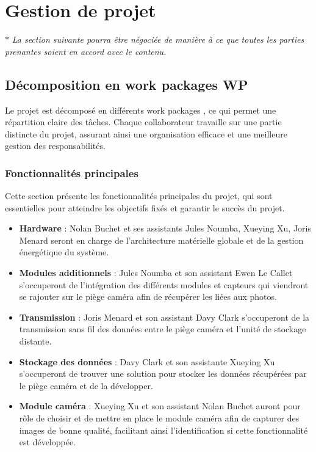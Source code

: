 \section{Gestion de projet}

$ \ast $ \textit{La section suivante pourra être négociée de manière à ce que toutes les parties prenantes soient en accord avec le contenu.}

\subsection{Décomposition en work packages WP}
Le projet est décomposé en différents work packages , ce qui permet une répartition claire des tâches.
Chaque collaborateur travaille sur une partie distincte du projet, assurant ainsi une organisation efficace et une meilleure gestion des responsabilités.

\subsubsection{Fonctionnalités principales}
Cette section présente les fonctionnalités principales du projet, qui sont essentielles pour atteindre les objectifs fixés et garantir le succès du projet. \\
\begin{itemize}
    \item \textbf{Hardware} : Nolan Buchet et ses assistants Jules Noumba, Xueying Xu, Joris Menard seront en charge de l’architecture matérielle globale et de la gestion énergétique du système.
    \item \textbf{Modules additionnels} : Jules Noumba et son assistant Ewen Le Callet s’occuperont de l’intégration des différents modules et capteurs qui viendront se rajouter sur le piège caméra afin de récupérer les  liées aux photos.
    \item \textbf{Transmission} : Joris Menard et son assistant Davy Clark s'occuperont de la transmission sans fil des données entre le piège caméra et l'unité de stockage distante.
    \item \textbf{Stockage des données} : Davy Clark et son assistante Xueying Xu s'occuperont de trouver une solution pour stocker les données récupérées par le piège caméra et de la développer.
    \item \textbf{Module caméra} : Xueying Xu et son assistant Nolan Buchet auront pour rôle de choisir et de mettre en place le module caméra afin de capturer des images de bonne qualité, facilitant ainsi l'identification si cette fonctionnalité est développée.
\end{itemize}

